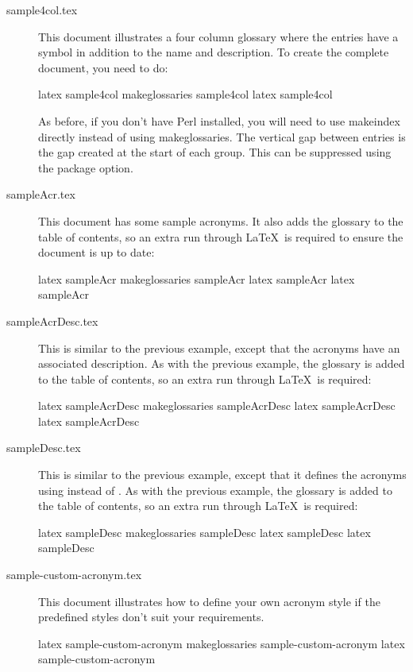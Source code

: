 \documentclass[report]{nlctdoc}
\begin{document}
\begin{description}
\item[sample4col.tex]\label{ex:sample4col} This document illustrates
a four column glossary where the entries have a symbol in addition
to the name and description. To create the complete document, you
need to do:
\begin{prompt}
latex sample4col
makeglossaries sample4col
latex sample4col
\end{prompt}
As before, if you don't have Perl installed, you will need to use
\gls{makeindex} directly instead of using
\gls{makeglossaries}. The vertical gap between entries is the
gap created at the start of each group. This can be suppressed
using the  package option.

\item[sampleAcr.tex]\label{ex:sampleAcr} This document has some
sample acronyms. It also adds the glossary to the table of contents,
so an extra run through \LaTeX\ is required to ensure the document
is up to date:
\begin{prompt}
latex sampleAcr
makeglossaries sampleAcr
latex sampleAcr
latex sampleAcr
\end{prompt}

\item[sampleAcrDesc.tex]\label{ex:sampleAcrDesc} This is similar to
the previous example, except that the acronyms have an associated
description. As with the previous example, the glossary is added to
the table of contents, so an extra run through \LaTeX\ is required:
\begin{prompt}
latex sampleAcrDesc
makeglossaries sampleAcrDesc
latex sampleAcrDesc
latex sampleAcrDesc
\end{prompt}

\item[sampleDesc.tex]\label{ex:sampleDesc} This is similar to the
previous example, except that it defines the acronyms using
 instead of . As with the
previous example, the glossary is added to the table of contents, so
an extra run through \LaTeX\ is required:
\begin{prompt}
latex sampleDesc
makeglossaries sampleDesc
latex sampleDesc
latex sampleDesc
\end{prompt}

\item[sample-custom-acronym.tex]\label{ex:sample-custom-acronym}
This document illustrates how to define your own acronym style if
the predefined styles don't suit your requirements.
\begin{prompt}
latex sample-custom-acronym
makeglossaries sample-custom-acronym
latex sample-custom-acronym
\end{prompt}


\end{description}
\end{document}
